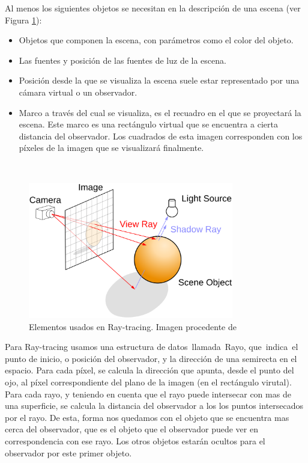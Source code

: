 Al menos los siguientes objetos se necesitan en la descripción de una escena (ver Figura \ref{fig:etiq_51}):
\begin{itemize}
	\item Objetos que componen la escena, con parámetros como el color del objeto.
	\item Las fuentes y posición de las fuentes de luz de la escena.
	\item Posición desde la que se visualiza la escena suele estar representado por una cámara virtual o un observador.
	\item Marco a través del cual se visualiza, es el recuadro en el que se proyectará la escena. Este marco es una rectángulo virtual que se encuentra a cierta distancia del observador. Los cuadrados de esta imagen corresponden con los píxeles de la imagen que se visualizará finalmente.
\end{itemize}
${ }$\\

\begin{figure}[h]
	\begin{center}
		\includegraphics[width=0.8\textwidth]{imagenes/tracing}
	\end{center}
	\caption{Elementos usados en Ray-tracing. Imagen procedente de \cite{ref8}}
	\label{fig:etiq_51}
\end{figure}

Para Ray-tracing usamos una estructura de datos llamada Rayo, que indica el punto de inicio, o posición del observador, y la dirección de una semirecta en el espacio. Para cada píxel, se calcula la dirección que apunta, desde el punto del ojo, al píxel correspondiente del plano de la imagen (en el rectángulo virutal). Para cada rayo, y teniendo en cuenta que el rayo puede intersecar con mas de una superficie, se calcula la distancia del observador a los los puntos intersecados por el rayo. De esta, forma nos quedamos con el objeto que se encuentra mas cerca del observador, que es el objeto que el observador puede ver en correspondencia con ese rayo. Los otros objetos estarán ocultos para el observador por este primer objeto.
${ }$\\

